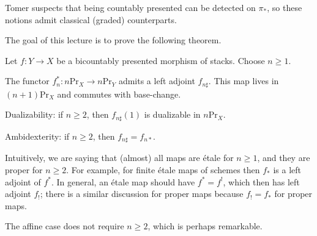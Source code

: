\documentclass[../notes.tex]{subfiles}
\begin{document}
\begin{remark}
	Tomer suspects that being countably presented can be detected on $\pi_*$, so these notions admit classical (graded) counterparts.
\end{remark}
The goal of this lecture is to prove the following theorem.
\begin{theorem} \label{thm:6ff-stacks}
	Let $f\colon Y\to X$ be a bicountably presented morphism of stacks. Choose $n\ge1$.
	\begin{listalph}
		\item The functor $f_n^*\colon n\mathrm{Pr}_X\to n\mathrm{Pr}_Y$ admits a left adjoint $f_{n\sharp}$. This map lives in $(n+1)\mathrm{Pr}_X$ and commutes with base-change.
		\item Dualizability: if $n\ge2$, then $f_{n\sharp}(1)$ is dualizable in $n\mathrm{Pr}_X$.
		\item Ambidexterity: if $n\ge2$, then $f_{n\sharp}=f_{n*}$.
	\end{listalph}
\end{theorem}
Intuitively, we are saying that (almost) all maps are \'etale for $n\ge1$, and they are proper for $n\ge2$. For example, for finite \'etale maps of schemes then $f_*$ is a left adjoint of $f^*$. In general, an \'etale map should have $f^*=f^!$, which then has left adjoint $f_!$; there is a similar discussion for proper maps because $f_!=f_*$ for proper maps.
\begin{remark}
	The affine case does not require $n\ge2$, which is perhaps remarkable.
\end{remark}
\end{document}
